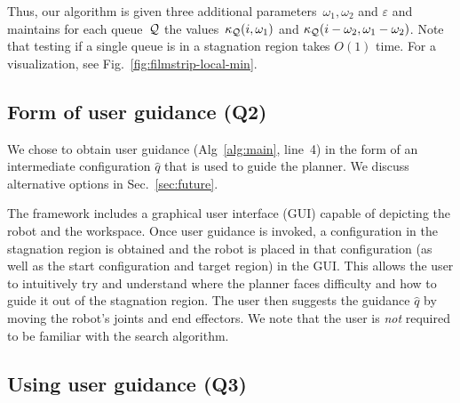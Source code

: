 \documentclass[conference]{IEEEtran}
\begin{document}

Thus, our algorithm is given three additional parameters~$\omega_1, \omega_2$ and $\varepsilon$ 
and maintains  for each queue~$\mathcal{Q}$ the values~$\kappa_{\mathcal{Q}}(i, \omega_1)$ and $\kappa_{\mathcal{Q}}(i - \omega_2, \omega_1 - \omega_2)$.
Note that testing if a single queue is in a stagnation region takes $O(1)$ time.
For a visualization, see Fig.~\ref{fig:filmstrip-local-min}.

\subsection{Form of user guidance (Q2)}
\label{sec:q2}
We chose to obtain user guidance 
(Alg~\ref{alg:main}, line~4)
in the form of an intermediate configuration $\hat{q}$ that is used to guide the planner. We discuss alternative options in Sec.~\ref{sec:future}.

The framework includes a graphical user interface (GUI)
 capable of  depicting the robot and the workspace.
Once user guidance is invoked, 
a configuration in the stagnation region is obtained and the robot is placed in that configuration (as well as the start configuration and target region) in the GUI.
This allows the user to intuitively try and understand where the planner faces difficulty and how to guide it out of the stagnation region.
The user then suggests the guidance $\hat{q}$ by moving the robot's joints and end effectors.
We note that the user is \emph{not} required to be familiar with the search algorithm.

\subsection{Using user guidance (Q3)}
\label{sec:q3}
\noindent 
{}
\end{document}
